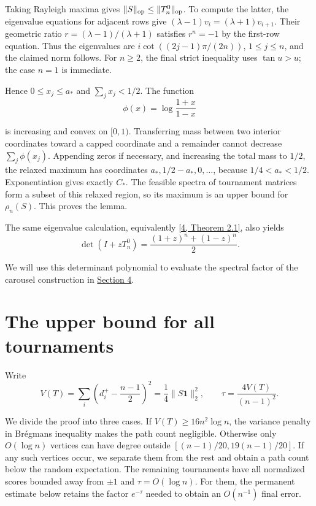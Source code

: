 \documentclass[11pt,a4paper]{article}
\newcommand{\paperref}[2]{\hyperref[#1]{#2}}
\begin{document}
Taking Rayleigh maxima gives \(\|S\|_{\rm op}\le\|T_n^0\|_{\rm op}\). To compute the latter, the eigenvalue equations for adjacent rows give \((\lambda-1)v_i=(\lambda+1)v_{i+1}\). Their geometric ratio \(r=(\lambda-1)/(\lambda+1)\) satisfies \(r^n=-1\) by the first-row equation. Thus the eigenvalues are \(i\cot((2j-1)\pi/(2n))\), \(1\le j\le n\), and the claimed norm follows. For \(n\ge2\), the final strict inequality uses \(\tan u>u\); the case \(n=1\) is immediate.

Hence \(0\le x_j\le a_*\) and \(\sum_jx_j<1/2\). The function
\[\phi(x)=\log\frac{1+x}{1-x}\]

is increasing and convex on \([0,1)\). Transferring mass between two interior coordinates toward a capped coordinate and a remainder cannot decrease \(\sum_j\phi(x_j)\). Appending zeros if necessary, and increasing the total mass to \(1/2\), the relaxed maximum has coordinates \(a_*,1/2-a_*,0,\ldots\), because \(1/4<a_*<1/2\). Exponentiation gives exactly \(C_*\). The feasible spectra of tournament matrices form a subset of this relaxed region, so its maximum is an upper bound for \(\rho_n(S)\). This proves the lemma.

The same eigenvalue calculation, equivalently \paperref{bib-4}{[4, Theorem 2.1]}, also yields
\[\det(I+zT_n^0)=\frac{(1+z)^n+(1-z)^n}{2}.\]

We will use this determinant polynomial to evaluate the spectral factor of the carousel construction in \paperref{sec-4}{Section 4}.

\section{The upper bound for all tournaments}\label{sec-3}

Write
\[V(T)=\sum_i\left(d_i^+-\frac{n-1}{2}\right)^2
=\frac14\|S\mathbf1\|_2^2,
\qquad
\tau=\frac{4V(T)}{(n-1)^2}.\]

We divide the proof into three cases. If \(V(T)\ge16n^2\log n\), the variance penalty in Brégman\textquotesingle s inequality makes the path count negligible. Otherwise only \(O(\log n)\) vertices can have degree outside \([(n-1)/20,19(n-1)/20]\). If any such vertices occur, we separate them from the rest and obtain a path count below the random expectation. The remaining tournaments have all normalized scores bounded away from \(\pm1\) and \(\tau=O(\log n)\). For them, the permanent estimate below retains the factor \(e^{-\tau}\) needed to obtain an \(O(n^{-1})\) final error.
\end{document}
